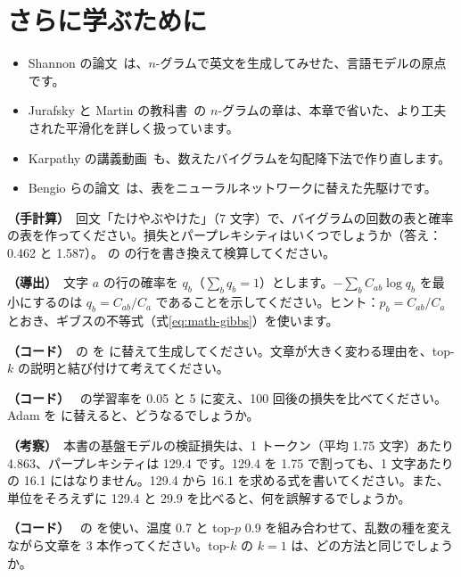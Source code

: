 \section*{さらに学ぶために}

\begin{itemize}
\item Shannon の論文~\cite{shannon1948mathematical}は、$n$-グラムで英文を生成してみせた、言語モデルの原点です。
\item Jurafsky と Martin の教科書~\cite{jurafsky2025slp}の $n$-グラムの章は、本章で省いた、より工夫された平滑化を詳しく扱っています。
\item Karpathy の講義動画~\cite{karpathy2022zerotohero}も、数えたバイグラムを勾配降下法で作り直します。
\item Bengio らの論文~\cite{bengio2003neural}は、表をニューラルネットワークに替えた先駆けです。
\end{itemize}

\begin{exercises}
\item \textbf{（手計算）}\ 回文「たけやぶやけた」（7 文字）で、バイグラムの回数の表と確率の表を作ってください。損失とパープレキシティはいくつでしょうか（答え：0.462 と 1.587）。 の  の行を書き換えて検算してください。
\item\label{ex:lm-mle} \textbf{（導出）}\ 文字 $a$ の行の確率を $q_b$（$\sum_b q_b=1$）とします。$-\sum_b C_{ab}\log q_b$ を最小にするのは $q_b=C_{ab}/C_a$ であることを示してください。ヒント：$p_b=C_{ab}/C_a$ とおき、ギブスの不等式（式\eqref{eq:math-gibbs}）を使います。
\item \textbf{（コード）}\ の  を  に替えて生成してください。文章が大きく変わる理由を、top-$k$ の説明と結び付けて考えてください。
\item\label{ex:lm-lr} \textbf{（コード）}\  の学習率を 0.05 と 5 に変え、100 回後の損失を比べてください。Adam を  に替えると、どうなるでしょうか。
\item \textbf{（考察）}\ 本書の基盤モデルの検証損失は、1 トークン（平均 1.75 文字）あたり 4.863、パープレキシティは 129.4 です。129.4 を 1.75 で割っても、1 文字あたりの 16.1 にはなりません。129.4 から 16.1 を求める式を書いてください。また、単位をそろえずに 129.4 と 29.9 を比べると、何を誤解するでしょうか。
\item \textbf{（コード）}\  の  を使い、温度 0.7 と top-$p$ 0.9 を組み合わせて、乱数の種を変えながら文章を 3 本作ってください。top-$k$ の $k=1$ は、どの方法と同じでしょうか。
\end{exercises}
